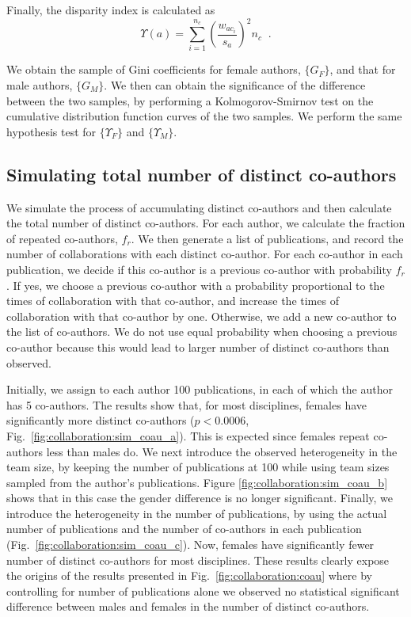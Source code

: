 \noindent
Finally, the disparity index is calculated as
\begin{equation}
\Upsilon(a) = \sum \limits_{i=1}^{n_c} \left( \frac{w_{ac_i}}{s_{a}} \right)^2 n_c\;\;.
\end{equation}

\noindent
We obtain the sample of Gini coefficients for female authors, $\{G_F\}$, and that for male authors, $\{G_M\}$. We then can obtain the significance of the difference between the two samples, by performing a Kolmogorov-Smirnov test on the cumulative distribution function curves of the two samples. We perform the same hypothesis test for $\{\Upsilon_F\}$ and $\{\Upsilon_M\}$.


\subsection{Simulating total number of distinct co-authors}

We simulate the process of accumulating distinct co-authors and then calculate the total number of distinct co-authors. For each author, we calculate the fraction of repeated co-authors, $f_r$. We then generate a list of publications, and record the number of collaborations with each distinct co-author. For each co-author in each publication, we decide if this co-author is a previous co-author with probability $f_r$. If yes, we choose a previous co-author with a probability proportional to the times of collaboration with that co-author, and increase the times of collaboration with that co-author by one. Otherwise, we add a new co-author to the list of co-authors. We do not use equal probability when choosing a previous co-author because this would lead to larger number of distinct co-authors than observed.

Initially, we assign to each author 100 publications, in each of which the author has 5 co-authors. The results show that, for most disciplines, females have significantly more distinct co-authors ($p<0.0006$, Fig.~\ref{fig:collaboration:sim_coau_a}). This is expected since females repeat co-authors less than males do. We next introduce the observed heterogeneity in the team size, by keeping the number of publications at 100 while using team sizes sampled from the author's publications. Figure \ref{fig:collaboration:sim_coau_b} shows that in this case the gender difference is no longer significant. Finally, we introduce the heterogeneity in the number of publications, by using the actual number of publications and the number of co-authors in each publication (Fig.~\ref{fig:collaboration:sim_coau_c}). Now, females have significantly fewer number of distinct co-authors for most disciplines. These results clearly expose the origins of the results presented in Fig.~\ref{fig:collaboration:coau} where by controlling for number of publications alone we observed no statistical significant difference between males and females in the number of distinct co-authors.


